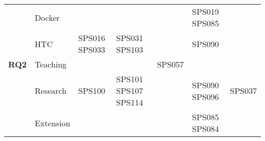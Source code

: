 \begin{table*}[htbp]
\begin{tabularx}{\textwidth}{p{0.8cm}p{2.5cm}>{\raggedright\arraybackslash}X>{\raggedright\arraybackslash}X>{\raggedright\arraybackslash}X>{\raggedright\arraybackslash}X>{\raggedright\arraybackslash}X}
		\addlinespace[0.3em]
		                                      & Docker                  &        			 	&                    	&                    	& SPS019 SPS085							&                    \\
		\addlinespace[0.3em]
		                                      & HTC                     & SPS016 SPS033 	 	& SPS031 SPS103         & 				      	& SPS090      							&                    \\
		\midrule
		\multirow{0}{*}[1.2em]{\textbf{RQ2}}  & Teaching                &        			 	&                    	& SPS057             	&  										&            		 \\
		\addlinespace[0.3em]
											  & Research                & SPS100       			& SPS101 SPS107 SPS114  &              			& SPS090 SPS096							& SPS037             \\
		\addlinespace[0.3em]
											  & Extension               &        			 	&                    	&              			& SPS085 SPS084 						&            		 \\
		\bottomrule
	\end{tabularx}
\end{table*}

